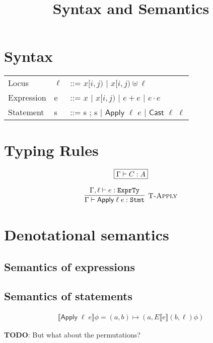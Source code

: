 \documentclass[runningheads]{llncs}
\newcommand {\ra} {\rightarrow}
\newcommand {\labinfer} [3] [] {\infer[{\textsc{#1}}]{#2}{#3}}
\newcommand {\State} {\textsf{State}}
\newcommand {\Value} {\textsf{Value}}
\newcommand {\Locus} {\textsf{Locus}}
\newcommand {\Loc} {\textsf{Location}}
\newcommand {\sem} [1] {\llbracket #1 \rrbracket}
\newcommand {\Esem} [1] {E\sem{#1}}
\newcommand {\Expr} {\textsf{Expr}}
\newcommand {\Cmd} {\textsf{Stmt}}
\newcommand {\CmdTy} {\texttt{Stmt}}
\newcommand {\ExprTy} {\texttt{ExprTy}}
\newcommand {\Apply} {\textsf{Apply}}
\newcommand {\Var} {\textsf{Var}}
\newcommand {\Index} {\textsf{Index}}
\newcommand {\Cast} {\textsf{Cast}}
\begin{document}
\title{Syntax and Semantics}
\author{}
\institute{}
\maketitle

\section{Syntax}

  \begin{tabular}{lll}
    Locus\; & $\ell$ & ::= $x[i, j)$ $\mid$ $x[i, j) \uplus \ell$\\
    Expression\; & e & ::= $x$ $\mid$ $x[i,j)$ $\mid$ $e + e$ $\mid$ $e \cdot e$\\
    Statement\; & s & ::= s ; s $\mid$ $\Apply$ $\ell$ $e$ $\mid$ $\Cast$ $\ell$ $\ell$
  \end{tabular}


\section{Typing Rules}

\[
  \begin{array}{c}
    \fbox{$\Gamma \vdash C : A$}
    \\\\
    \labinfer[T-Apply]{\Gamma \vdash \Apply\;\ell\;e : \CmdTy}
      {\Gamma, \ell \vdash e : \ExprTy}
  \end{array}
\]

\section{Denotational semantics}
    \fbox{
      \begin{minipage}{\textwidth}
      \[
      \begin{array}{ll}
        \Esem{\cdot} &{}: \Expr \ra (\Value \times \Locus) \ra \State \ra \State\\
                \sem{\cdot} &{}: \Cmd \ra (\State \ra \State)\\
                \State &{}= \Loc \ra \Value\\
                \Loc &{}= \Var \times \Index
          \end{array}
        \]
      \end{minipage}
}

\subsection{Semantics of expressions}

\subsection{Semantics of statements}

\[
  \begin{array}{c}
    \sem{\Apply\;\ell\;e}\phi = (a, b) \mapsto
               (a, \Esem{e}(b, \ell)\phi)
  \end{array}
\]

\textbf{TODO}: But what about the permutations?
\end{document}
